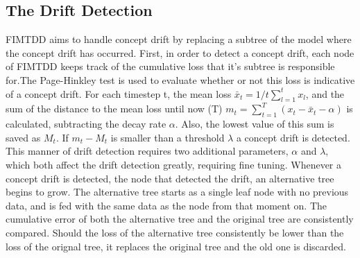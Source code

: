 \documentclass[a4paper,pt12]{article}
\begin{document}
\subsection{The Drift Detection}
FIMTDD aims to handle concept drift by replacing a subtree of the model where the concept drift has occurred. 
First, in order to detect a concept drift, each node of FIMTDD keeps track of the cumulative loss that it's subtree is responsible for.\newline The Page-Hinkley test is used to evaluate whether or not this loss is indicative of a concept drift. For each timestep t,  the mean loss $\bar{x}_{t}=1/t \sum_{l=1}^{t}x_{l}$, and the sum of the distance to the mean loss until now (T) $m_{t}=\sum_{t=1}^{T}(x_{t}-\bar{x}_{t}-\alpha)$ is calculated, subtracting the decay rate $\alpha$. Also, the lowest value of this sum is saved as $M_{t}$. If $m_{t}-M_{t}$ is smaller than a threshold $\lambda$ a concept drift is detected.\newline
This manner of drift detection requires two additional parameters, $\alpha$ and $\lambda$, which both affect the drift detection greatly, requiring fine tuning.\newline
Whenever a concept drift is detected, the node that detected the drift, an alternative tree begins to grow. The alternative tree starts as a single leaf node with no previous data, and is fed with the same data as the node from that moment on. The cumulative error of both the alternative tree and the original tree are consistently compared. Should the loss of the alternative tree consistently be lower than the loss of the orignal tree, it replaces the original tree and the old one is discarded.
\end{document}
